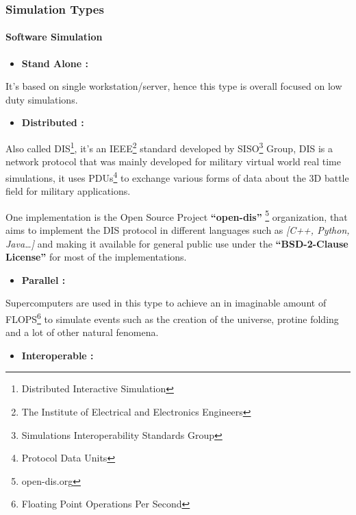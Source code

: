 \documentclass[
  14pt,
  english,
  a4paper,
]{scrreprt}
\providecommand{\tightlist}{%
  \setlength{\itemsep}{0pt}\setlength{\parskip}{0pt}}
\begin{document}
\hypertarget{simulation-types}{%
\subsubsection{Simulation Types}\label{simulation-types}}

\hypertarget{software-simulation}{%
\paragraph{Software Simulation}\label{software-simulation}}

\begin{itemize}
\tightlist
\item
  \textbf{Stand Alone :}
\end{itemize}

It's based on single workstation/server, hence this type is overall
focused on low duty simulations.

\begin{itemize}
\tightlist
\item
  \textbf{Distributed :}
\end{itemize}

Also called DIS\footnote{Distributed Interactive Simulation}, it's an
IEEE\footnote{The Institute of Electrical and Electronics Engineers}
standard developed by SISO\footnote{Simulations Interoperability
  Standards Group} Group, DIS is a network protocol that was mainly
developed for military virtual world real time simulations, it uses
PDUs\footnote{Protocol Data Units} to exchange various forms of data
about the 3D battle field for military applications.

One implementation is the Open Source Project \textbf{``open-dis''}
\footnote{open-dis.org} organization, that aims to implement the DIS
protocol in different languages such as \emph{{[}C++, Python,
Java\ldots{]}} and making it available for general public use under the
\textbf{``BSD-2-Clause License''} for most of the implementations.

\begin{itemize}
\tightlist
\item
  \textbf{Parallel :}
\end{itemize}

Supercomputers are used in this type to achieve an in imaginable amount
of FLOPS\footnote{Floating Point Operations Per Second} to simulate
events such as the creation of the universe, protine folding and a lot
of other natural fenomena.

\begin{itemize}
\tightlist
\item
  \textbf{Interoperable :}
\end{itemize}
\end{document}
